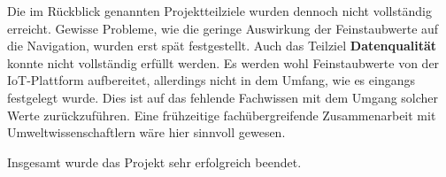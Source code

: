 Die im Rückblick genannten Projektteilziele wurden dennoch nicht vollständig erreicht. Gewisse Probleme, wie die geringe Auswirkung der Feinstaubwerte auf die Navigation, wurden erst spät festgestellt.
Auch das Teilziel \textbf{Datenqualität} konnte nicht vollständig erfüllt werden. 
Es werden wohl Feinstaubwerte von der IoT-Plattform aufbereitet, allerdings nicht in dem Umfang, wie es eingangs festgelegt wurde. 
Dies ist auf das fehlende Fachwissen mit dem Umgang solcher Werte zurückzuführen. 
Eine frühzeitige fachübergreifende Zusammenarbeit mit Umweltwissenschaftlern wäre hier sinnvoll gewesen. 

Insgesamt wurde das Projekt sehr erfolgreich beendet.
